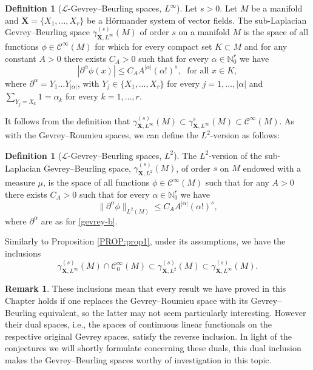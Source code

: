 \documentclass[12pt,oneside,a4paper]{book}
\numberwithin{equation}{section}     %
\theoremstyle{plain}
\theoremstyle{definition}
\newtheorem{definition}[theorem]{Definition}
\newtheorem{remark}[theorem]{Remark}
\newcommand{\N}{{\mathbb N}}
\newcommand{\slp}{{\mathcal L}}
\begin{document}
\begin{definition}[$\slp$-Gevrey--Beurling spaces, $L^\infty$]\label{DEF:gsl-b}
	Let $s>0$. Let $M$ be a manifold and $\mathbf{X}=\{X_1,\dots,X_r\}$ be a H\"ormander system of vector fields. The sub-Laplacian Gevrey--Beurling space $\gamma^{(s)}_{\mathbf{X},L^{\infty}}(M)$ of order $s$ on a manifold $M$ is the space of all functions $\phi\in\mathcal{C}^\infty(M)$ for which for every compact set $K\subset M$ and for any constant $A>0$ there exists $C_A>0$ such that for every $\alpha\in\N^r_0$ we have
	\begin{equation}\label{gevrey-b}
	|\partial^\alpha \phi(x)|\leq C_A A^{|\alpha|}(\alpha!)^s,\;\textrm{ for all } x\in K,
	\end{equation}
	where $\partial^\alpha=Y_1\dots Y_{|\alpha|}$, with $Y_j\in\{X_1,\dots,X_r\}$ for every $j=1,\dots,|\alpha|$ and $\sum_{Y_j=X_k}1=\alpha_k$ for every $k=1,\dots,r$.
\end{definition}	
It follows from the definition that $\gamma^{(s)}_{\mathbf{X},L^{\infty}}(M)\subset\gamma^{s}_{\mathbf{X},L^{\infty}}(M)\subset\mathcal{C}^{\infty}(M)$. As with the Gevrey--Roumieu spaces, we can define the $L^2$-version as follows:
\begin{definition}[$\slp$-Gevrey--Beurling spaces, $L^2$]
	The $L^2$-version of the sub-Laplacian Gevrey--Beurling space, $\gamma^{(s)}_{\mathbf{X},L^2}(M)$, of order $s$ on $M$ endowed with a measure $\mu$, is the space of all functions $\phi\in \mathcal{C}^\infty(M)$ such that for any $A>0$ there exists $C_A>0$ such that   for every $\alpha\in\N^r_0$ we have
	\begin{equation}\label{gevrey-b-L2}
	\|\partial^\alpha \phi\|_{L^2(M)}\leq C_A A^{|\alpha|}(\alpha!)^s,
	\end{equation}
	where $\partial^\alpha$ are as for \eqref{gevrey-b}.
\end{definition}
Similarly to Proposition \ref{PROP:prop1}, under its assumptions, we have the inclusions
\begin{equation}\label{EQ:inc-b}
\gamma^{(s)}_{\mathbf{X},L^{\infty}}(M)\cap \mathcal{C}_0^\infty(M)\subset \gamma^{(s)}_{\mathbf{X},L^2}(M) \subset \gamma^{(s)}_{\mathbf{X},L^{\infty}}(M).
\end{equation}
\begin{remark}
	These inclusions mean that every result we have proved in this Chapter holds if one replaces the Gevrey--Roumieu space with its Gevrey--Beurling equivalent, so the latter may not seem particularly interesting. However their dual spaces, i.e., the spaces of continuous linear functionals on the respective original Gevrey spaces, satisfy the reverse inclusion. In light of the conjectures we will shortly formulate concerning these duals, this dual inclusion makes the Gevrey--Beurling spaces worthy of investigation in this topic.
\end{remark}
\end{document}
